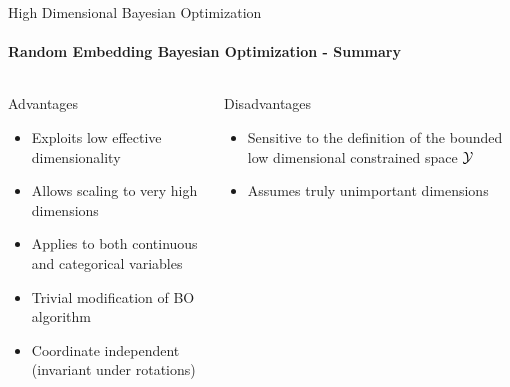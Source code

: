 \begin{frame}[c]{High Dimensional Bayesian Optimization}
\framesubtitle{Random Embedding Bayesian Optimization - Summary}
\begin{columns}[T] %
\begin{column}{.48\textwidth}


    \begin{block}{Advantages}
    \begin{itemize}
    	\item Exploits low effective dimensionality 
    	\item Allows scaling to very high dimensions
    	\item Applies to both continuous and categorical variables
    	\item Trivial modification of BO algorithm
    	\item Coordinate independent (invariant under rotations)
    \end{itemize}
    \end{block}
\pause
\end{column}%

\hfill%

\begin{column}{.48\textwidth}

    \begin{block}{Disadvantages}
    \begin{itemize}
    	\item Sensitive to the definition of the bounded low dimensional constrained space $\mathcal{Y}$
    	\item Assumes truly unimportant dimensions
    \end{itemize}
\end{block}

\end{column}
\end{columns}   
\end{frame}


